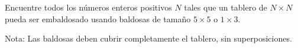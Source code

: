Encuentre todos los números enteros positivos $N$ tales que un tablero de $N\times N$ pueda ser embaldosado usando baldosas de tamaño $5\times 5$ o $1\times 3$. 

Nota: Las baldosas deben cubrir completamente el tablero, sin superposiciones.
